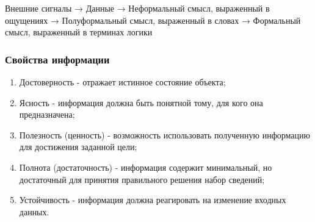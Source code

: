 Внешние сигналы 
→ Данные 
→ Неформальный смысл, выраженный в ощущениях 
→ Полуформальный смысл, выраженный в словах 
→ Формальный смысл, выраженный в терминах логики

\subsubsection{Свойства информации}
\begin{enumerate}  
  \item Достоверность - отражает истинное состояние объекта;
  \item Ясность - информация должна быть понятной тому, для кого она предназначена;
  \item Полезность (ценность) - возможность использовать полученную информацию для достижения заданной цели;
  \item Полнота (достаточность) - информация содержит минимальный, но достаточный для принятия правильного решения набор сведений;
  \item Устойчивость - информация должна реагировать на изменение входных данных.
\end{enumerate} 

